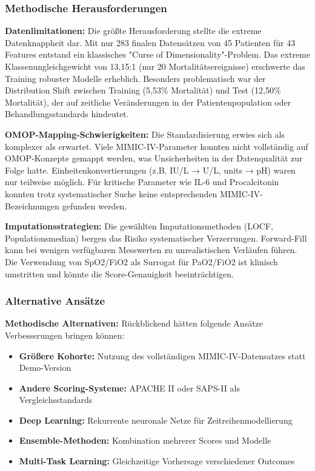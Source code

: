 \documentclass[12pt]{article}
\begin{document}
\subsubsection{Methodische Herausforderungen}

\textbf{Datenlimitationen:}
Die größte Herausforderung stellte die extreme Datenknappheit dar. Mit nur 283 finalen Datensätzen von 45 Patienten für 43 Features entstand ein klassisches "Curse of Dimensionality"-Problem. Das extreme Klassenungleichgewicht von 13,15:1 (nur 20 Mortalitätsereignisse) erschwerte das Training robuster Modelle erheblich. Besonders problematisch war der Distribution Shift zwischen Training (5,53\% Mortalität) und Test (12,50\% Mortalität), der auf zeitliche Veränderungen in der Patientenpopulation oder Behandlungsstandards hindeutet.

\textbf{OMOP-Mapping-Schwierigkeiten:}
Die Standardisierung erwies sich als komplexer als erwartet. Viele MIMIC-IV-Parameter konnten nicht vollständig auf OMOP-Konzepte gemappt werden, was Unsicherheiten in der Datenqualität zur Folge hatte. Einheitenkonvertierungen (z.B. IU/L → U/L, units → pH) waren nur teilweise möglich. Für kritische Parameter wie IL-6 und Procalcitonin konnten trotz systematischer Suche keine entsprechenden MIMIC-IV-Bezeichnungen gefunden werden.

\textbf{Imputationsstrategien:}
Die gewählten Imputationsmethoden (LOCF, Populationsmedian) bergen das Risiko systematischer Verzerrungen. Forward-Fill kann bei wenigen verfügbaren Messwerten zu unrealistischen Verläufen führen. Die Verwendung von SpO2/FiO2 als Surrogat für PaO2/FiO2 ist klinisch umstritten und könnte die Score-Genauigkeit beeinträchtigen.

\subsubsection{Alternative Ansätze}

\textbf{Methodische Alternativen:}
Rückblickend hätten folgende Ansätze Verbesserungen bringen können:
\begin{itemize}
    \item \textbf{Größere Kohorte:} Nutzung des vollständigen MIMIC-IV-Datensatzes statt Demo-Version
    \item \textbf{Andere Scoring-Systeme:} APACHE II oder SAPS-II als Vergleichsstandards
    \item \textbf{Deep Learning:} Rekurrente neuronale Netze für Zeitreihenmodellierung
    \item \textbf{Ensemble-Methoden:} Kombination mehrerer Scores und Modelle
    \item \textbf{Multi-Task Learning:} Gleichzeitige Vorhersage verschiedener Outcomes
\end{itemize}
\end{document}
